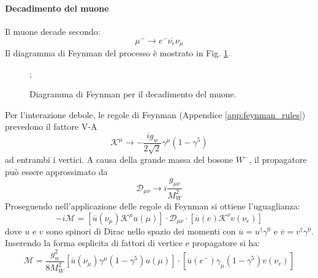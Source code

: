 \documentclass{subnucbo}
\begin{document}
\paragraph{Decadimento del muone} Il muone decade secondo:
\begin{equation}
        \mu^{-} \rightarrow e^{-} \overline{\nu_{e}} \nu_{\mu}
        \label{eq:muon_decay}
\end{equation}
Il diagramma di Feynman del processo è mostrato in Fig. \ref{fig:muon_decay}.
\begin{figure}[!h]
        \centering
        ;
        \caption{Diagramma di Feynman per il decadimento del muone.}
        \label{fig:muon_decay}
\end{figure}
Per l'interazione debole, le regole di Feynman (Appendice \ref{app:feynman_rules}) prevedono il fattore V-A
\begin{equation}
        \mathcal { K } ^ { \mu } \rightarrow - \frac { i g _ { w } } { 2 \sqrt { 2 } } \gamma ^ { \mu } \left( 1 - \gamma ^ { 5 } \right)
\end{equation}
ad entrambi i vertici. A causa della grande massa del bosone $W^{-}$, il propagatore può essere approssimato da
\begin{equation}
         \mathcal { D } _ { \mu \nu } \rightarrow i \frac { g _ { \mu \nu } } { M _ { W } ^ { 2 } }
        \label{eq:propagator}
\end{equation}
Proseguendo nell'applicazione delle regole di Feynman si ottiene l'uguaglianza:
\begin{equation}
        - i \mathcal { M } = \left[ \overline { u } \left( \nu _ { \mu } \right) \mathcal { K } ^ { \mu } u ( \mu ) \right] \cdot \mathcal { D } _ { \mu \nu } \cdot \left[ \overline { u } ( e ) \mathcal { K } ^ { \nu } v \left( \nu _ { e } \right) \right]
\end{equation}
dove $u$ e $v$ sono spinori di Dirac nello spazio dei momenti con $\overline { u } = u ^ { \dagger } \gamma ^ { 0 }$ e $\overline { v } = v ^ { \dagger } \gamma ^ { 0 }$. Inserendo la forma esplicita di fattori di vertice e propagatore si ha:
\begin{equation}
        \mathcal { M } = \frac { g _ { w } ^ { 2 } } { 8 M _ { W } ^ { 2 } } \left[ \overline { u } \left( \nu _ { \mu } \right) \gamma ^ { \mu } \left( 1 - \gamma ^ { 5 } \right) u ( \mu ) \right] \cdot \left[ \overline { u } \left( e ^ { - } \right) \gamma _ { \mu } \left( 1 - \gamma ^ { 5 } \right) v \left( \nu _ { e } \right) \right]
        \label{eq:amplitude_muon}
\end{equation}
\end{document}

